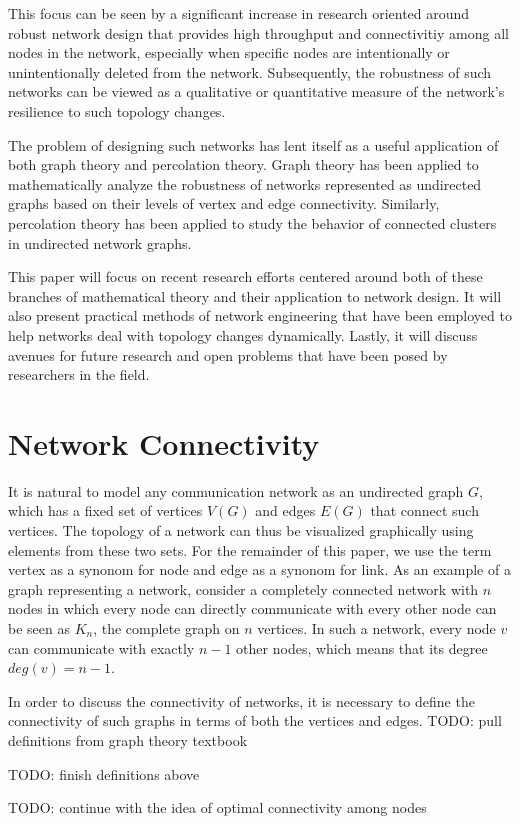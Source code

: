\documentclass[10pt,a4paper,onecolumn]{article}
\begin{document}
This focus can be seen by a significant increase in research oriented around robust network design that provides high throughput and connectivitiy among all nodes in the network, especially when specific nodes are intentionally or unintentionally deleted from the network. Subsequently, the robustness of such networks can be viewed as a qualitative or quantitative measure of the network's resilience to such topology changes.

The problem of designing such networks has lent itself as a useful application of both graph theory and percolation theory. Graph theory has been applied to mathematically analyze the robustness of networks represented as undirected graphs based on their levels of vertex and edge connectivity. Similarly, percolation theory has been applied to study the behavior of connected clusters in undirected network graphs. 

This paper will focus on recent research efforts centered around both of these branches of 
mathematical theory and their application to network design. It will also present practical methods of
network engineering that have been employed to help networks deal with topology changes dynamically.
Lastly, it will discuss avenues for future research and open problems that have been posed by 
researchers in the field.

\section{Network Connectivity}

It is natural to model any communication network as an undirected graph $G$, which has a fixed 
set of vertices $V(G)$ and edges $E(G)$ that connect such vertices. The topology of a network
can thus be visualized graphically using elements from these two sets. For the remainder of this paper,
we use the term vertex as a synonom for node and edge as a synonom for link. As an example of a graph representing a network, consider a completely connected network with $n$ nodes in which every node can directly communicate with every other 
node can be seen as $K_{n}$, the complete graph on $n$ vertices. In such a network, every node $v$ can
communicate with exactly $n-1$ other nodes, which means that its degree $deg(v) = n-1$. 

In order to discuss the connectivity of networks, it is necessary to define the connectivity of such
graphs in terms of both the vertices and edges. TODO: pull definitions from graph theory textbook

TODO: finish definitions above

TODO: continue with the idea of optimal connectivity among nodes




\end{document}
